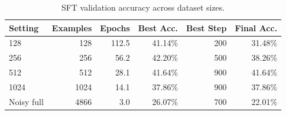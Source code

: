 \begin{table}[h]
\centering
\begin{tabular}{lrrrrr}
\toprule
Setting & Examples & Epochs & Best Acc. & Best Step & Final Acc. \\
\midrule
128 & 128 & 112.5 & 41.14\% & 200 & 31.48\% \\
256 & 256 & 56.2 & 42.20\% & 500 & 38.26\% \\
512 & 512 & 28.1 & 41.64\% & 900 & 41.64\% \\
1024 & 1024 & 14.1 & 37.86\% & 900 & 37.86\% \\
Noisy full & 4866 & 3.0 & 26.07\% & 700 & 22.01\% \\
\bottomrule
\end{tabular}
\caption{SFT validation accuracy across dataset sizes.}
\label{tab:sft-size-sweep}
\end{table}
